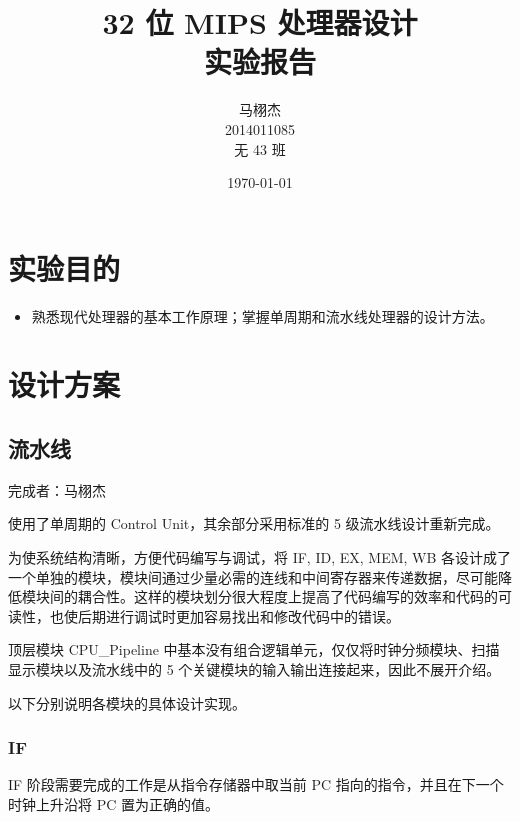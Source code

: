 \documentclass[a4paper]{article}
\title{32 位 MIPS 处理器设计\\实验报告}
\author{马栩杰 \\ 2014011085 \\ 无 43 班}
\date{\today}
\begin{document}
\maketitle

\section{实验目的}
\label{sec:实验目的}

\begin{itemize}
  \item 熟悉现代处理器的基本工作原理；掌握单周期和流水线处理器的设计方法。
\end{itemize}

\section{设计方案}
\label{sec:设计方案}

\subsection{流水线}
\label{sub:流水线}

完成者：马栩杰

使用了单周期的 Control Unit，其余部分采用标准的 5 级流水线设计重新完成。

为使系统结构清晰，方便代码编写与调试，将 IF, ID, EX, MEM, WB 各设计成了一个单独的模块，模块间通过少量必需的连线和中间寄存器来传递数据，尽可能降低模块间的耦合性。这样的模块划分很大程度上提高了代码编写的效率和代码的可读性，也使后期进行调试时更加容易找出和修改代码中的错误。

顶层模块 CPU\_Pipeline 中基本没有组合逻辑单元，仅仅将时钟分频模块、扫描显示模块以及流水线中的 5 个关键模块的输入输出连接起来，因此不展开介绍。

以下分别说明各模块的具体设计实现。

\subsubsection{IF}
\label{subs:IF}

IF 阶段需要完成的工作是从指令存储器中取当前 PC 指向的指令，并且在下一个时钟上升沿将 PC 置为正确的值。
\end{document}
